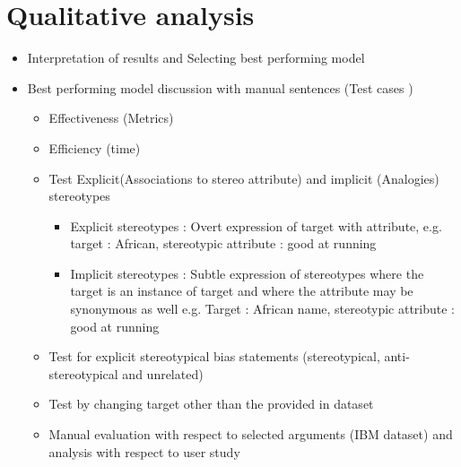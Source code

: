 \section{Qualitative analysis} \label{Qualitative_analysis}
\begin{itemize}
    \item Interpretation of results and Selecting best performing model 
    \item Best performing model discussion with manual sentences (Test cases ) 
    \begin{itemize}
        \item Effectiveness (Metrics)
        \item Efficiency (time)
        \item Test Explicit(Associations to stereo attribute) and implicit (Analogies) stereotypes
        \begin{itemize}
            \item Explicit stereotypes : Overt expression of target with attribute, e.g. target : African, stereotypic attribute : good at running
            \item Implicit stereotypes : Subtle expression of stereotypes where the target is an instance of target and where the attribute may be synonymous as well
            e.g. Target : African name, stereotypic attribute :  good at running 
        \end{itemize} 
        \item Test for explicit stereotypical bias statements  (stereotypical, anti-stereotypical and unrelated)
        \item Test by changing target other than the provided in dataset 
        \item Manual evaluation with respect to selected arguments (IBM dataset) and analysis with respect to user study 
    \end{itemize}
\end{itemize}
